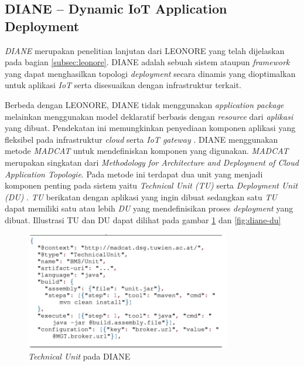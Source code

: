 \subsection{DIANE – Dynamic IoT Application Deployment}
\textit{DIANE} merupakan penelitian lanjutan dari LEONORE yang telah dijelaskan pada bagian \ref{subsec:leonore}. DIANE adalah sebuah sistem ataupun \textit{framework} yang dapat menghasilkan topologi \textit{deployment} secara dinamis yang dioptimalkan untuk aplikasi \textit{IoT} serta disesuaikan dengan infrastruktur terkait.

Berbeda dengan LEONORE, DIANE tidak menggunakan \textit{application package} melainkan menggunakan model deklaratif berbasis dengan \textit{resource} dari \textit{aplikasi} yang dibuat. Pendekatan ini memungkinkan penyediaan komponen aplikasi yang fleksibel pada infrastruktur \textit{cloud} serta \textit{IoT gateway} \parencite{vogler2015diane}. DIANE menggunakan metode \textit{MADCAT} untuk mendefiniskan komponen yang digunakan. \textit{MADCAT} merupakan singkatan dari \textit{Methodology for Architecture and Deployment of Cloud Application Topologie}. Pada metode ini terdapat dua unit yang menjadi komponen penting pada sistem yaitu \textit{Technical Unit (TU)} serta \textit{Deployment Unit (DU)} \parencite{madcat}. \textit{TU} berikatan dengan aplikasi yang ingin dibuat sedangkan satu \textit{TU} dapat memiliki satu atau lebih \textit{DU} yang mendefinisikan proses \textit{deployment} yang dibuat. Illustrasi TU dan DU dapat dilihat pada gambar \ref{fig:diane-tu} dan \ref{fig:diane-du}

\begin{figure}[ht]
  \centering
  \includegraphics[width=0.8\textwidth]{resources/chapter-2/diane-technical-unit.jpg}
  \caption{\textit{Technical Unit} pada DIANE \parencite{vogler2015diane}}
  \label{fig:diane-tu}
\end{figure}

